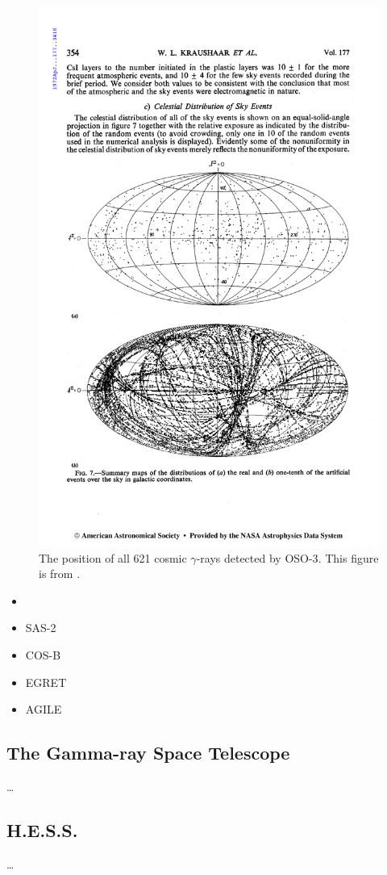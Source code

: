 \begin{figure}[htb]
\includegraphics{chapters/introduction/figures/kraushaar_et_al_1972_skymap.pdf}
\caption{The position of all 621 cosmic $\gamma$-rays
detected by \ac{OSO-3}. This figure is from 
\cite{oso_3_kraushaar_1972}. }
\end{figure}




\begin{itemize}
\item 
  

  \item SAS-2
  \item COS-B
  \item EGRET

  \item AGILE
\end{itemize}

\subsection{The \fermi Gamma-ray Space Telescope}

\ldots


\subsection{H.E.S.S.}

\ldots
